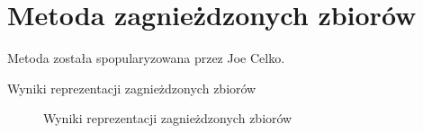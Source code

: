 \section{Metoda zagnieżdzonych zbiorów}
Metoda została spopularyzowana przez Joe Celko\cite{celko}.



\begin{table}[h!]
  \caption{Wyniki reprezentacji zagnieżdzonych zbiorów}
   \begin{center}
   \end{center}
\end{table}

\begin{figure}[h!t]
  \caption{Wyniki reprezentacji zagnieżdzonych zbiorów}
  \label{fig:img_chart_nested}
  \begin{center}
  \end{center}
\end{figure}

\clearpage